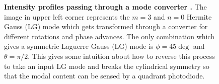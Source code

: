 \begin{figure}[h]
	\centering
	\caption[Intensity profiles passing through a mode converter. ]
	{\textbf{Intensity profiles passing through a mode converter \cite{ONeilModeTransform}.} 
	The image in upper left corner represents the $m=3$ and $n=0$ Hermite Gauss (LG) mode which gets transformed through a converter for different rotations and phase advances.  The only combination which gives a symmetric Laguerre Gauss (LG) mode is $\phi=45\deg$ and $\theta=\pi/2$.  This gives some intuition about how to reverse this process to take an input LG mode and breaks the cylindrical symmetry so that the modal content can be sensed by a quadrant photodiode.
	}
	\label{fig:Oneil_modeconv}
\end{figure}

